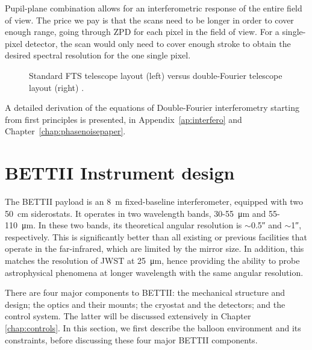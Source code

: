 Pupil-plane combination allows for an interferometric response of the entire field of view. The price we pay is that the \OPD scans need to be longer in order to cover enough range, going through ZPD for each pixel in the field of view. For a single-pixel detector, the \OPD scan would only need to cover enough stroke to obtain the desired spectral resolution for the one single pixel.



\begin{figure}[!ht]
	\centering
	
	\caption[FTS vs Double-Fourier]{Standard FTS telescope layout (left) versus double-Fourier telescope layout (right) \citep{Mariotti:1988vea}.}
	\label{fig:FTSvsDoubleFourier}
    \end{figure}

A detailed derivation of the equations of Double-Fourier interferometry starting from first principles is presented, in Appendix~\ref{ap:interfero} and Chapter~\ref{chap:phasenoisepaper}.

\section{BETTII Instrument design}



The BETTII payload is an \SI{8}{\meter} fixed-baseline interferometer, equipped with two \SI{50}{\centi\meter} siderostats. It operates in two wavelength bands, 30-55~\si{\micro\meter} and 55-110~\si{\micro\meter}. In these two bands, its theoretical angular resolution is $\sim$\ang{;;0.5} and $\sim$\ang{;;1}, respectively. This is significantly better than all existing or previous facilities that operate in the far-infrared, which are limited by the mirror size. In addition, this matches the resolution of JWST at \SI{25}{\micro\meter}, hence providing the ability to probe astrophysical phenomena at longer wavelength with the same angular resolution.

There are four major components to BETTII: the mechanical structure and design; the optics and their mounts; the cryostat and the detectors; and the control system. The latter will be discussed extensively in Chapter \ref{chap:controls}. In this section, we first describe the balloon environment and its constraints, before discussing these four major BETTII components. 

